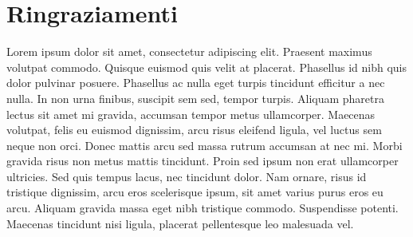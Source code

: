 \chapter*{Ringraziamenti}

Lorem ipsum dolor sit amet, consectetur adipiscing elit. Praesent maximus volutpat commodo. Quisque euismod quis velit at placerat. Phasellus id nibh quis dolor pulvinar posuere. Phasellus ac nulla eget turpis tincidunt efficitur a nec nulla. In non urna finibus, suscipit sem sed, tempor turpis. Aliquam pharetra lectus sit amet mi gravida, accumsan tempor metus ullamcorper. Maecenas volutpat, felis eu euismod dignissim, arcu risus eleifend ligula, vel luctus sem neque non orci. Donec mattis arcu sed massa rutrum accumsan at nec mi. Morbi gravida risus non metus mattis tincidunt. Proin sed ipsum non erat ullamcorper ultricies. Sed quis tempus lacus, nec tincidunt dolor. Nam ornare, risus id tristique dignissim, arcu eros scelerisque ipsum, sit amet varius purus eros eu arcu. Aliquam gravida massa eget nibh tristique commodo. Suspendisse potenti. Maecenas tincidunt nisi ligula, placerat pellentesque leo malesuada vel.
